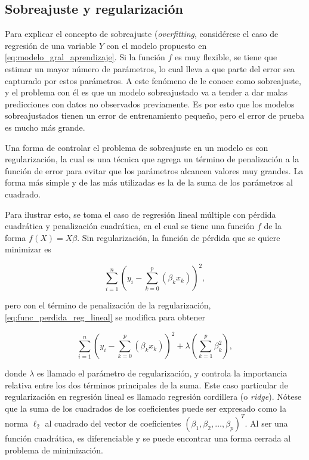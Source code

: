 \subsection{Sobreajuste y regularización}

Para explicar el concepto de sobreajuste (\textit{overfitting}, considérese el caso de regresión de una variable $Y$ con el modelo propuesto en \ref{eq:modelo_gral_aprendizaje}. Si la función $f$ es muy flexible, se tiene que estimar un mayor número de parámetros, lo cual lleva a que parte del error sea capturado por estos parámetros. A este fenómeno de le conoce como sobreajuste, y el problema con él es que un modelo sobreajustado va a tender a dar malas predicciones con datos no observados previamente. Es por esto que los modelos sobreajustados tienen un error de entrenamiento pequeño, pero el error de prueba es mucho más grande.

Una forma de controlar el problema de sobreajuste en un modelo es con regularización, la cual es una técnica que agrega un término de penalización a la función de error para evitar que los parámetros alcancen valores muy grandes. La forma más simple y de las más utilizadas es la de la suma de los parámetros al cuadrado. 

Para ilustrar esto, se toma el caso de regresión lineal múltiple con pérdida cuadrática y penalización cuadrática, en el cual se tiene una función $f$ de la forma $f(X) = X \beta$. Sin regularización, la función de pérdida que se quiere minimizar es

\begin{equation}
  \label{eq:func_perdida_reg_lineal}
  \sum_{i = 1}^n{ \left( y_i - \sum_{k = 0}^p \left( \beta_k x_k \right) \right) ^ 2},
\end{equation}

pero con el término de penalización de la regularización, \ref{eq:func_perdida_reg_lineal} se modifica para obtener

\begin{equation}
  \label{eq:func_perdida_reg_lineal_reg}
  \sum_{i = 1}^n{ \left( y_i - \sum_{k = 0}^p \left( \beta_k x_k \right) \right) ^ 2} 
  + \lambda \left( \sum_{k = 1}^p \beta_k^2 \right),
\end{equation}

donde $\lambda$ es llamado el parámetro de regularización, y controla la importancia relativa entre los dos términos principales de la suma. Este caso particular de regularización en regresión lineal es llamado regresión cordillera (o \textit{ridge}). Nótese que la suma de los cuadrados de los coeficientes puede ser expresado como la norma $\ell_2$ al cuadrado del vector de coeficientes $\left( \beta_1, \beta_2, \hdots, \beta_p \right)^T$. Al ser una función cuadrática, es diferenciable y se puede encontrar una forma cerrada al problema de minimización.

